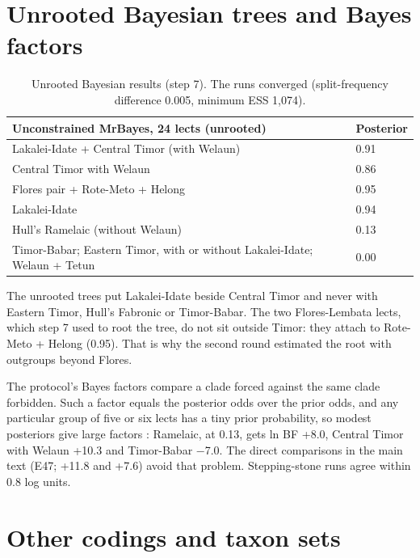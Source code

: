 \documentclass[11pt]{article}
\newcommand{\hd}[1]{\begin{minipage}[b]{\linewidth}\raggedright #1\end{minipage}}
\begin{document}
\section{Unrooted Bayesian trees and Bayes factors}\label{sec:unrooted}

\begin{table}[tbp]
\caption{Unrooted Bayesian results (step 7). The runs converged
(split-frequency difference 0.005, minimum ESS 1,074).}
\label{tab:unrooted}
\begin{tabularx}{\linewidth}{@{}L{1.667}L{0.333}@{}}
\toprule
\hd{Unconstrained MrBayes, 24 lects (unrooted)} & \hd{Posterior} \\
\midrule
Lakalei-Idate + Central Timor (with Welaun) & 0.91 \\
Central Timor with Welaun & 0.86 \\
Flores pair + Rote-Meto + Helong & 0.95 \\
Lakalei-Idate & 0.94 \\
Hull's Ramelaic (without Welaun) & 0.13 \\
Timor-Babar; Eastern Timor, with or without Lakalei-Idate; Welaun + Tetun & 0.00 \\
\bottomrule
\end{tabularx}
\end{table}

The unrooted trees put Lakalei-Idate beside Central Timor and never with Eastern Timor, Hull's Fabronic or Timor-Babar. The two Flores-Lembata lects, which step 7 used to root the tree, do not sit outside Timor: they attach to Rote-Meto + Helong (0.95). That is why the second round estimated the root with outgroups beyond Flores.

The protocol's Bayes factors compare a clade forced against the same clade forbidden. Such a factor equals the posterior odds over the prior odds, and any particular group of five or six lects has a tiny prior probability, so modest posteriors give large factors \citep{bergsten2013}: Ramelaic, at 0.13, gets ln BF +8.0, Central Timor with Welaun +10.3 and Timor-Babar −7.0. The direct comparisons in the main text (E47; +11.8 and +7.6) avoid that problem. Stepping-stone runs agree within 0.8 log units.

\section{Other codings and taxon sets}\label{sec:codings}
\end{document}
